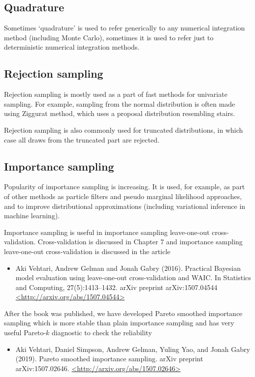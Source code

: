 \documentclass[a4paper,11pt,english]{article}
\begin{document}
 \subsection*{Quadrature}

 Sometimes `quadrature' is used to refer generically to any numerical
 integration method (including Monte Carlo), sometimes it is used to
 refer just to deterministic numerical integration methods.

 \subsection*{Rejection sampling}

 Rejection sampling is mostly used as a part of fast methods for
 univariate sampling. For example, sampling from the normal
 distribution is often made using Ziggurat method, which uses a
 proposal distribution resembling stairs.

 Rejection sampling is also commonly used for truncated distributions,
 in which case all draws from the truncated part are rejected.

 \subsection*{Importance sampling}

 Popularity of importance sampling is increasing. It is used, for
 example, as part of other methods as particle filters and pseudo
 marginal likelihood approaches, and to improve distributional
 approximations (including variational inference in machine learning).

 Importance sampling is useful in importance sampling leave-one-out
 cross-validation. Cross-validation is discussed in Chapter 7 and
 importance sampling leave-one-out cross-validation is discussed in
 the article
 \begin{itemize}
 \item Aki Vehtari, Andrew Gelman and Jonah Gabry (2016). Practical
   Bayesian model evaluation using leave-one-out cross-validation and
   WAIC. In Statistics and Computing, 27(5):1413--1432. arXiv preprint
   arXiv:1507.04544 \url{<http://arxiv.org/abs/1507.04544>}
 \end{itemize}

 After the book was published, we have developed Pareto smoothed
 importance sampling which is more stable than plain importance
 sampling and has very useful Pareto-$k$ diagnostic to check the
 reliability
\begin{itemize}
\item Aki Vehtari, Daniel Simpson, Andrew Gelman, Yuling Yao, and
  Jonah Gabry (2019). Pareto smoothed importance sampling. arXiv
  preprint arXiv:1507.02646. \url{<http://arxiv.org/abs/1507.02646>}
 \end{itemize}
\end{document}
